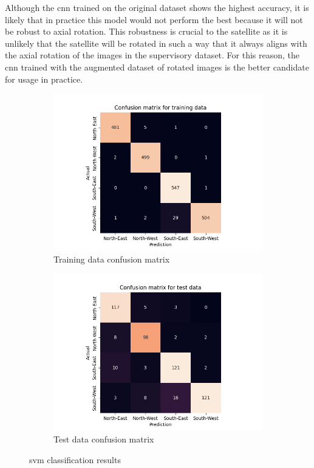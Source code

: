 \documentclass[10pt,twocolumn,letterpaper]{article}
\begin{document}
Although the \acrshort{cnn} trained on the original dataset shows the highest accuracy, it is likely that in practice this model would not perform the best because it will not be robust to axial rotation. This robustness is crucial to the satellite as it is unlikely that the satellite will be rotated in such a way that it always aligns with the axial rotation of the images in the supervisory dataset. For this reason, the \acrshort{cnn} trained with the augmented dataset of rotated images is the better candidate for usage in practice.

\begin{figure}[p]
  \centering
  \begin{subfigure}{.33\linewidth}
    \includegraphics[width=\linewidth, trim={7em, 0em, 9em, 5em}, clip]{svm_cfsn_train}
    \caption{Training data confusion matrix}
    \label{fig:svm_train}
  \end{subfigure}
  \begin{subfigure}{0.33\linewidth}
    \includegraphics[width=\linewidth, trim={7em, 0em, 9em, 5em}, clip]{svm_cfsn_test}
    \caption{Test data confusion matrix}
    \label{fig:svm_test}
  \end{subfigure}
  \caption{\acrlong{svm} classification results}
  \label{fig:svm_res}
\end{figure}
\end{document}
